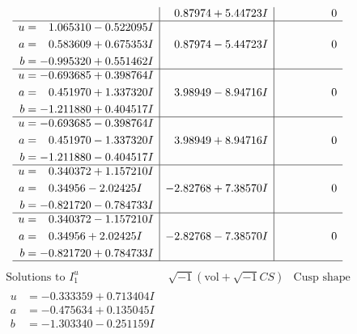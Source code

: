 \documentclass[1p]{elsarticle_modified}
\theoremstyle{definition}
\newcommand{\I}{\sqrt{-1}}
\begin{document}
$$\begin{array}{c|c|c}
 & \phantom{-}0.87974 + 5.44723 I & \phantom{-0.000000 } 0 \\ \hline\begin{aligned}
u &= \phantom{-}1.065310 - 0.522095 I \\
a &= \phantom{-}0.583609 + 0.675353 I \\
b &= -0.995320 + 0.551462 I\end{aligned}
 & \phantom{-}0.87974 - 5.44723 I & \phantom{-0.000000 } 0 \\ \hline\begin{aligned}
u &= -0.693685 + 0.398764 I \\
a &= \phantom{-}0.451970 + 1.337320 I \\
b &= -1.211880 + 0.404517 I\end{aligned}
 & \phantom{-}3.98949 - 8.94716 I & \phantom{-0.000000 } 0 \\ \hline\begin{aligned}
u &= -0.693685 - 0.398764 I \\
a &= \phantom{-}0.451970 - 1.337320 I \\
b &= -1.211880 - 0.404517 I\end{aligned}
 & \phantom{-}3.98949 + 8.94716 I & \phantom{-0.000000 } 0 \\ \hline\begin{aligned}
u &= \phantom{-}0.340372 + 1.157210 I \\
a &= \phantom{-}0.34956 - 2.02425 I \\
b &= -0.821720 - 0.784733 I\end{aligned}
 & -2.82768 + 7.38570 I & \phantom{-0.000000 } 0 \\ \hline\begin{aligned}
u &= \phantom{-}0.340372 - 1.157210 I \\
a &= \phantom{-}0.34956 + 2.02425 I \\
b &= -0.821720 + 0.784733 I\end{aligned}
 & -2.82768 - 7.38570 I & \phantom{-0.000000 } 0\\
 \hline 
 \end{array}$$\newpage$$\begin{array}{c|c|c}  
\text{Solutions to }I^u_{1}& \I (\text{vol} + \sqrt{-1}CS) & \text{Cusp shape}\\
 \hline 
\begin{aligned}
u &= -0.333359 + 0.713404 I \\
a &= -0.475634 + 0.135045 I \\
b &= -1.303340 - 0.251159 I\end{aligned}

\end{array}$$
\end{document}
